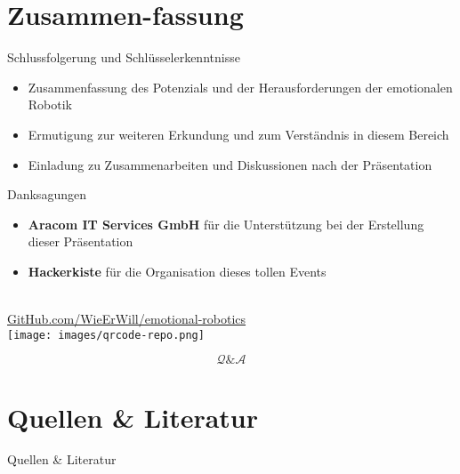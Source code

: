 \documentclass[aspectratio=169]{beamer}
\begin{document}
\section{Zusammen-fassung}
\begin{frame}{Schlussfolgerung und Schlüsselerkenntnisse}
  \begin{itemize}
    \item Zusammenfassung des Potenzials und der Herausforderungen der emotionalen Robotik
    \item Ermutigung zur weiteren Erkundung und zum Verständnis in diesem Bereich
    \item Einladung zu Zusammenarbeiten und Diskussionen nach der Präsentation
  \end{itemize}
\end{frame}

\begin{frame}{Danksagungen}
  \begin{itemize}
    \item \textbf{Aracom IT Services GmbH} für die Unterstützung bei der Erstellung dieser Präsentation
    \item \textbf{Hackerkiste} für die Organisation dieses tollen Events
  \end{itemize}
\end{frame}

\begin{frame}[c]{}
  \centering
  \begin{minipage}{\textwidth}
    \centering
    \Large {}\\
    \href{https://github.com/wieerwill/emotional-robotics}{GitHub.com/WieErWill/emotional-robotics}\\
    \vspace{.4cm}
    \texttt{[image: images/qrcode-repo.png]}
  \end{minipage}
\end{frame}

\begin{frame}[c]{}
  \centering
  \begin{minipage}{\textwidth}
    \centering
    \Huge \[\mathcal Q \& \mathcal A\]
    \Large {}
  \end{minipage}
\end{frame}

\section{Quellen \& Literatur}
\begin{frame}[allowframebreaks]{Quellen \& Literatur}
  \scriptsize
  
  
\end{frame}
\end{document}
